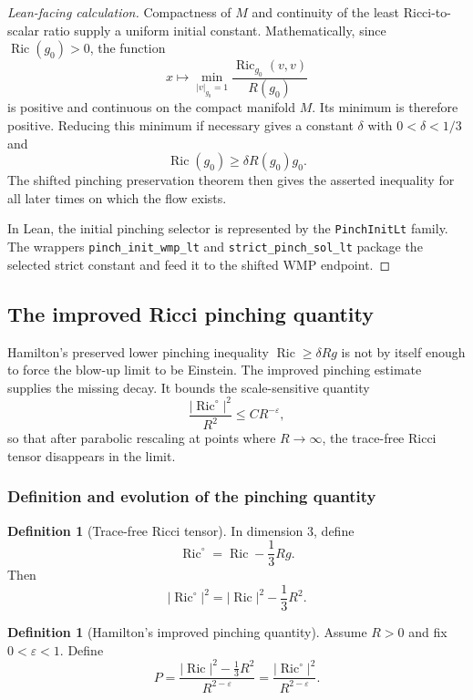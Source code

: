 \documentclass[11pt]{article}
\theoremstyle{plain}
\theoremstyle{definition}
\newtheorem{definition}[theorem]{Definition}
\theoremstyle{remark}
\newcommand{\Ric}{\operatorname{Ric}}
\newcommand{\norm}[1]{\left|#1\right|}
\newcommand{\eps}{\varepsilon}
\newcommand{\leanref}[1]{\nolinkurl{#1}}
\begin{document}
\begin{proof}[Lean-facing calculation]
Compactness of \(M\) and continuity of the least Ricci-to-scalar ratio supply a
uniform initial constant.  Mathematically, since \(\Ric(g_0)>0\), the function
\[
x\mapsto \min_{\norm{v}_{g_0}=1}\frac{\Ric_{g_0}(v,v)}{R(g_0)}
\]
is positive and continuous on the compact manifold \(M\).  Its minimum is
therefore positive.  Reducing this minimum if necessary gives a constant
\(\delta\) with \(0<\delta<1/3\) and
\[
\Ric(g_0)\ge \delta R(g_0)g_0.
\]
The shifted pinching preservation theorem then gives the asserted inequality
for all later times on which the flow exists.

In Lean, the initial pinching selector is represented by the
\leanref{PinchInitLt} family.  The wrappers \leanref{pinch_init_wmp_lt} and
\leanref{strict_pinch_sol_lt} package the selected strict constant and feed it
to the shifted WMP endpoint.
\end{proof}

\subsection{The improved Ricci pinching quantity}

Hamilton's preserved lower pinching inequality \(\Ric \ge \delta Rg\) is not
by itself enough to force the blow-up limit to be Einstein.  The improved
pinching estimate supplies the missing decay.  It bounds the scale-sensitive
quantity
\[
  \frac{\norm{\Ric^\circ}^2}{R^2}
  \le C R^{-\varepsilon},
\]
so that after parabolic rescaling at points where \(R\to\infty\), the
trace-free Ricci tensor disappears in the limit.

\subsubsection{Definition and evolution of the pinching quantity}

\begin{definition}[Trace-free Ricci tensor]
\label{def:tracefree-ricci}
In dimension $3$, define
\[
\Ric^\circ
=
\Ric-\frac13Rg.
\]
Then
\[
\norm{\Ric^\circ}^2
=
\norm{\Ric}^2-\frac13R^2.
\]
\end{definition}

\begin{definition}[Hamilton's improved pinching quantity]
\label{def:pinching-P}
Assume $R>0$ and fix $0<\eps<1$. Define
\[
P
=
\frac{\norm{\Ric}^2-\frac13R^2}{R^{2-\eps}}
=
\frac{\norm{\Ric^\circ}^2}{R^{2-\eps}}.
\]
\end{definition}
\end{document}

